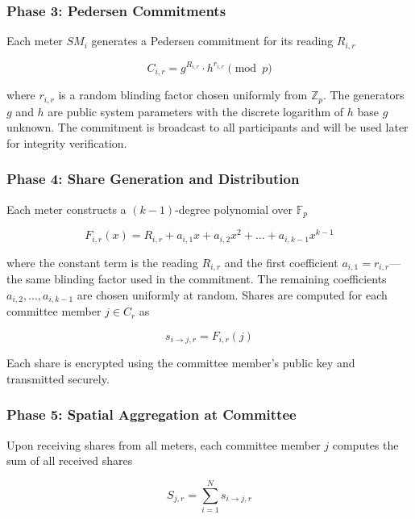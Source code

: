 \documentclass[conference]{IEEEtran}
\begin{document}
\subsubsection{Phase 3: Pedersen Commitments}

Each meter $SM_i$ generates a Pedersen commitment \cite{pedersen1991non} for its reading $R_{i,r}$

\begin{equation}
C_{i,r} = g^{R_{i,r}} \cdot h^{r_{i,r}} \pmod{p}
\end{equation}

where $r_{i,r}$ is a random blinding factor chosen uniformly from $\mathbb{Z}_p$. The generators $g$ and $h$ are public system parameters with the discrete logarithm of $h$ base $g$ unknown. The commitment is broadcast to all participants and will be used later for integrity verification.

\subsubsection{Phase 4: Share Generation and Distribution}

Each meter constructs a $(k-1)$-degree polynomial over $\mathbb{F}_p$

\begin{equation}
F_{i,r}(x) = R_{i,r} + a_{i,1}x + a_{i,2}x^2 + \ldots + a_{i,k-1}x^{k-1}
\end{equation}

where the constant term is the reading $R_{i,r}$ and the first coefficient $a_{i,1} = r_{i,r}$—the same blinding factor used in the commitment. The remaining coefficients $a_{i,2}, \ldots, a_{i,k-1}$ are chosen uniformly at random. Shares are computed for each committee member $j \in C_r$ as

\begin{equation}
s_{i \to j,r} = F_{i,r}(j)
\end{equation}

Each share is encrypted using the committee member's public key and transmitted securely.

\subsubsection{Phase 5: Spatial Aggregation at Committee}

Upon receiving shares from all meters, each committee member $j$ computes the sum of all received shares

\begin{equation}
S_{j,r} = \sum_{i=1}^{N} s_{i \to j,r}
\end{equation}
\end{document}
